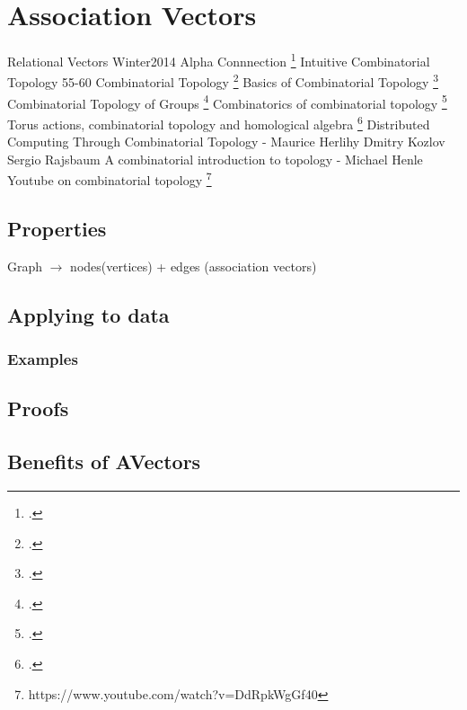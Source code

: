 \section{Association Vectors}
Relational Vectors {Winter2014}  \newline
Alpha Connnection \footcite{Amari1987}   \newline
Intuitive Combinatorial Topology 55-60   \newline
Combinatorial Topology \footcite{Hicks}   \newline
Basics of Combinatorial Topology \footcite{BasicCombinatorialTopology}   \newline
Combinatorial Topology of Groups \footcite{Everitt2009}   \newline
Combinatorics of combinatorial topology \footcite{Melikhov2012}   \newline
Torus actions, combinatorial topology and homological algebra \footcite{Panov2000}   \newline
Distributed Computing Through Combinatorial Topology - Maurice Herlihy Dmitry Kozlov Sergio Rajsbaum   \newline
A combinatorial introduction to topology - Michael Henle
Youtube on combinatorial topology \footnote{https://www.youtube.com/watch?v=DdRpkWgGf40}

\subsection{Properties}
Graph $\rightarrow$ nodes(vertices) + edges (association vectors)
\subsection{Applying to data}
\subsubsection{Examples}
\subsection{Proofs}
\subsection{Benefits of AVectors}
